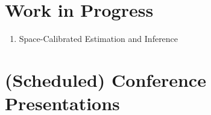 \documentclass[12pt,letterpaper]{article}
\begin{document}
\section*{Work in Progress}
\begin{enumerate}

\item Space-Calibrated Estimation and Inference %

\end{enumerate}

\section*{(Scheduled) Conference Presentations}
\end{document}
